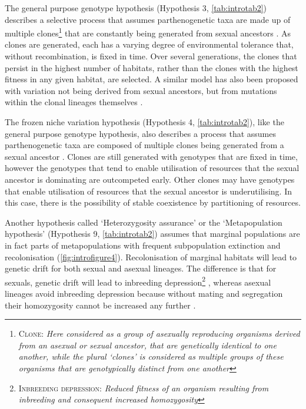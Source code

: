 The general purpose genotype hypothesis (Hypothesis 3, \cref{tab:introtab2}) describes a selective process that assumes parthenogenetic taxa are made up of multiple clones\footnote[4]{\textsc{Clone:} \textit{Here considered as a group of asexually reproducing organisms derived from an asexual or sexual ancestor, that are genetically identical to one another, while the plural `clones' is considered as multiple groups of these organisms that are genotypically distinct from one another}} that are constantly being generated from sexual ancestors \parencite{parker_jr_geographic_2002}. As clones are generated, each has a varying degree of environmental tolerance that, without recombination, is fixed in time. Over several generations, the clones that persist in the highest number of habitats, rather than the clones with the highest fitness in any given habitat, are selected. A similar model has also been proposed with variation not being derived from sexual ancestors, but from mutations within the clonal lineages themselves \parencite{lynch_destabilizing_1984}.

The frozen niche variation hypothesis (Hypothesis 4, \cref{tab:introtab2}), like the general purpose genotype hypothesis, also describes a process that assumes parthenogenetic taxa are composed of multiple clones being generated from a sexual ancestor \parencite{vrijenhoek_ecological_1984,vrijenhoek_factors_1979}. Clones are still generated with genotypes that are fixed in time, however the genotypes that tend to enable utilisation of resources that the sexual ancestor is dominating are outcompeted early. Other clones may have genotypes that enable utilisation of resources that the sexual ancestor is underutilising. In this case, there is the possibility of stable coexistence by partitioning of resources.

Another hypothesis called `Heterozygosity assurance' or the `Metapopulation hypothesis' (Hypothesis 9, \cref{tab:introtab2}) assumes that marginal populations are in fact parts of metapopulations with frequent subpopulation extinction and recolonisation (\cref{fig:introfigure4}). Recolonisation of marginal habitats will lead to genetic drift for both sexual and asexual lineages. The difference is that for sexuals, genetic drift will lead to inbreeding depression\footnote[5]{\textsc{Inbreeding depression:} \textit{Reduced fitness of an organism resulting from inbreeding and consequent increased homozygosity}} \parencite{charlesworth_inbreeding_1987}, whereas asexual lineages avoid inbreeding depression because without mating and segregation their homozygosity cannot be increased any further \parencite{haag_new_2004,vrijenhoek_heterozygosity_1982}.

